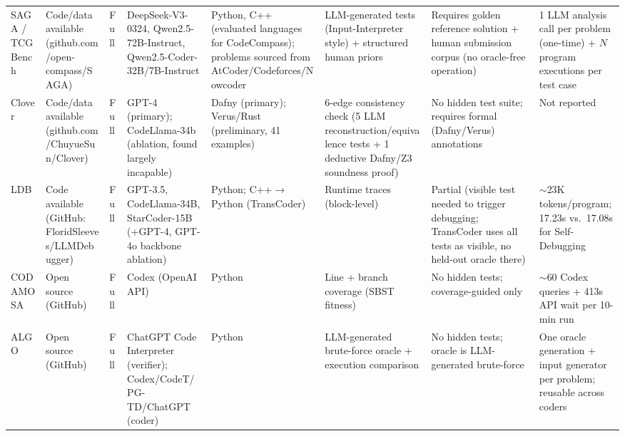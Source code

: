 \documentclass[10pt,a4paper]{article}
\begin{document}
\begin{table}[!t]
\begin{tabularx}{\textwidth}{@{}p{48pt}p{55pt}p{30pt}p{68pt}p{62pt}p{72pt}p{78pt}X@{}}
SAGA / TCGBench~\cite{ma2025saga} & Code/data available (github.com/open-compass/SAGA) & Full & DeepSeek-V3-0324, Qwen2.5-72B-Instruct, Qwen2.5-Coder-32B/7B-Instruct & Python, C++ (evaluated languages for CodeCompass); problems sourced from AtCoder/Codeforces/Nowcoder & LLM-generated tests (Input-Interpreter style) + structured human priors & Requires golden reference solution + human submission corpus (no oracle-free operation) & 1 LLM analysis call per problem (one-time) + $N$ program executions per test case \\
Clover~\cite{sun2024clover} & Code/data available (github.com/ChuyueSun/Clover) & Full & GPT-4 (primary); CodeLlama-34b (ablation, found largely incapable) & Dafny (primary); Verus/Rust (preliminary, 41 examples) & 6-edge consistency check (5 LLM reconstruction/equivalence tests + 1 deductive Dafny/Z3 soundness proof) & No hidden test suite; requires formal (Dafny/Verus) annotations & Not reported \\
LDB~\cite{zhong2024ldb}\footnotemark & Code available (GitHub: FloridSleeves/LLMDebugger) & Full & GPT-3.5, CodeLlama-34B, StarCoder-15B (+GPT-4, GPT-4o backbone ablation) & Python; C++$\to$Python (TransCoder) & Runtime traces (block-level) & Partial (visible test needed to trigger debugging; TransCoder uses all tests as visible, no held-out oracle there) & $\sim$23K tokens/program; 17.23s vs.\ 17.08s for Self-Debugging \\
CODAMOSA~\cite{lemieux2023codamosa} & Open source (GitHub) & Full & Codex (OpenAI API) & Python & Line + branch coverage (SBST fitness) & No hidden tests; coverage-guided only & $\sim$60 Codex queries + 413s API wait per 10-min run \\
ALGO~\cite{zhang2023algo} & Open source (GitHub) & Full & ChatGPT Code Interpreter (verifier); Codex/CodeT/PG-TD/ChatGPT (coder) & Python & LLM-generated brute-force oracle + execution comparison & No hidden tests; oracle is LLM-generated brute-force & One oracle generation + input generator per problem; reusable across coders \\
\bottomrule
\end{tabularx}
\end{table}
\end{document}
